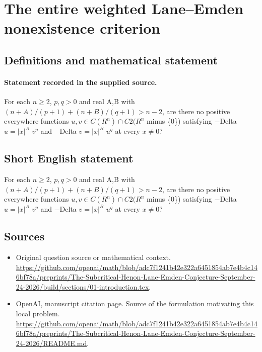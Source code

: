 \documentclass[11pt]{article}
\begin{document}
\section*{The entire weighted Lane–Emden nonexistence criterion}\label{statement}
\subsection{Definitions and mathematical statement}
\paragraph{Statement recorded in the supplied source.}
For each $n\geq 2$, $p,q>0$ and real A,B with $(n+A)/(p+1)+(n+B)/(q+1)>n-2$, are there no positive everywhere functions $u,v\in C(R^n)\cap C2(R^n$ minus \{0\}) satisfying $-$Delta $u=|x|^A$ $v^p$ and $-$Delta $v=|x|^B$ $u^q$ at every $x\neq 0$?
\subsection{Short English statement}
For each $n\geq 2$, $p,q>0$ and real A,B with $(n+A)/(p+1)+(n+B)/(q+1)>n-2$, are there no positive everywhere functions $u,v\in C(R^n)\cap C2(R^n$ minus \{0\}) satisfying $-$Delta $u=|x|^A$ $v^p$ and $-$Delta $v=|x|^B$ $u^q$ at every $x\neq 0$?
\subsection{Sources}
\begin{itemize}
\item[S1] Original question source or mathematical context.
\url{https://github.com/openai/math/blob/adc7f1241b42e322a6451854ab7e4b4c146bf78a/preprints/The-Subcritical-Henon-Lane-Emden-Conjecture-September-24-2026/build/sections/01-introduction.tex}.
\item[S2] OpenAI, manuscript citation page. Source of the formulation motivating this local problem.
\url{https://github.com/openai/math/blob/adc7f1241b42e322a6451854ab7e4b4c146bf78a/preprints/The-Subcritical-Henon-Lane-Emden-Conjecture-September-24-2026/README.md}.
\end{itemize}
\end{document}
